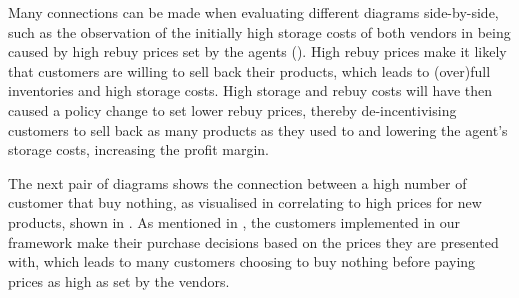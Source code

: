 Many connections can be made when evaluating different diagrams side-by-side, such as the observation of the initially high storage costs of both vendors in  being caused by high rebuy prices set by the agents (). High rebuy prices make it likely that customers are willing to sell back their products, which leads to (over)full inventories and high storage costs. High storage and rebuy costs will have then caused a policy change to set lower rebuy prices, thereby de-incentivising customers to sell back as many products as they used to and lowering the agent's storage costs, increasing the profit margin.

The next pair of diagrams shows the connection between a high number of customer that buy nothing, as visualised in  correlating to high prices for new products, shown in . As mentioned in , the customers implemented in our framework make their purchase decisions based on the prices they are presented with, which leads to many customers choosing to buy nothing before paying prices as high as set by the vendors.

